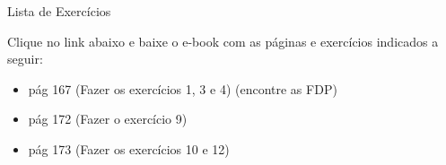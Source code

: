 \documentclass{beamer}
\begin{document}
\begin{frame}{Lista de Exercícios}

Clique no link abaixo e baixe o e-book com as páginas e exercícios indicados a seguir:

\vspace{.5cm}


\begin{itemize}
    \item pág 167 (Fazer os exercícios 1, 3 e 4) (encontre as FDP)
    \item pág 172 (Fazer o exercício 9)
    \item pág 173 (Fazer os exercícios 10 e 12)
\end{itemize}

\end{frame}

\end{document}
